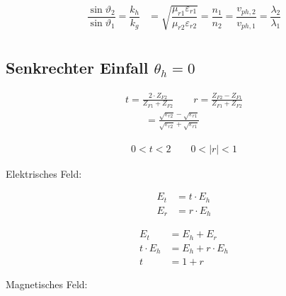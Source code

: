 \begin{align*}
    \dfrac{\sin \vartheta_{2}}{\sin \vartheta_{1}} = \dfrac{k_{h}}{k_{g}} & = \sqrt{\dfrac{\mu_{r 1} \varepsilon_{r 1}}{\mu_{r 2} \varepsilon_{r 2}}} = \dfrac{n_{1}}{n_{2}} = \dfrac{v_{p h, 2}}{v_{p h, 1}} = \dfrac{\lambda_{2}}{\lambda_{1}} \\
\end{align*}
\newpage
\subsection{Senkrechter Einfall $ \theta_h = 0$ }



\begin{align*}
    t  = \frac{2 \cdot Z_{F2}}{Z_{F1} + Z_{F2}}\qquad r  = \frac{Z_{F2} - Z_{F1}}{Z_{F1} + Z_{F2}} \\
    \qquad = \frac{\sqrt{\varepsilon_{r2}}-\sqrt{\varepsilon_{r1}}}{\sqrt{\varepsilon_{r2}}+\sqrt{\varepsilon_{r1}}}
\end{align*}

\begin{align*}
    0<t<2 \qquad 0<|r|<1
\end{align*}

Elektrisches Feld:


\begin{align*}
    E_t & = t \cdot E_h \\
    E_r & = r \cdot E_h
\end{align*}

\begin{align*}
    E_t          & = E_h + E_r             \\
    t\cdot E_{h} & = E_{h} + r\cdot  E_{h} \\
    t            & = 1+ r
\end{align*}

Magnetisches Feld:


